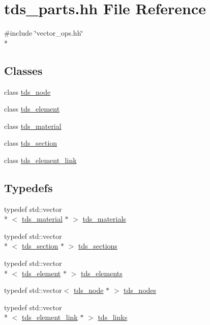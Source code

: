 \hypertarget{tds__parts_8hh}{\section{tds\-\_\-parts.\-hh File Reference}
\label{tds__parts_8hh}
}
{\ttfamily \#include \char`\"{}vector\-\_\-ops.\-hh\char`\"{}}\\*
\subsection*{Classes}
\begin{DoxyCompactItemize}
\item 
class \hyperlink{classtds__node}{tds\-\_\-node}
\item 
class \hyperlink{classtds__element}{tds\-\_\-element}
\item 
class \hyperlink{classtds__material}{tds\-\_\-material}
\item 
class \hyperlink{classtds__section}{tds\-\_\-section}
\item 
class \hyperlink{classtds__element__link}{tds\-\_\-element\-\_\-link}
\end{DoxyCompactItemize}
\subsection*{Typedefs}
\begin{DoxyCompactItemize}
\item 
typedef std\-::vector\\*
$<$ \hyperlink{classtds__material}{tds\-\_\-material} $\ast$ $>$ \hyperlink{tds__parts_8hh_a972ae401709b50fd79befb06dd952170}{tds\-\_\-materials}
\item 
typedef std\-::vector\\*
$<$ \hyperlink{classtds__section}{tds\-\_\-section} $\ast$ $>$ \hyperlink{tds__parts_8hh_aef503d0ac251112b915fc3a8918962f2}{tds\-\_\-sections}
\item 
typedef std\-::vector\\*
$<$ \hyperlink{classtds__element}{tds\-\_\-element} $\ast$ $>$ \hyperlink{tds__parts_8hh_af35ca3b18f7ed6e38a9bfb5639d5a23e}{tds\-\_\-elements}
\item 
typedef std\-::vector$<$ \hyperlink{classtds__node}{tds\-\_\-node} $\ast$ $>$ \hyperlink{tds__parts_8hh_ad445cf91d41fc0e37fcaf259adec00ef}{tds\-\_\-nodes}
\item 
typedef std\-::vector\\*
$<$ \hyperlink{classtds__element__link}{tds\-\_\-element\-\_\-link} $\ast$ $>$ \hyperlink{tds__parts_8hh_a5d3b1cd92297b3ee827cdf0fff431aef}{tds\-\_\-links}
\end{DoxyCompactItemize}



